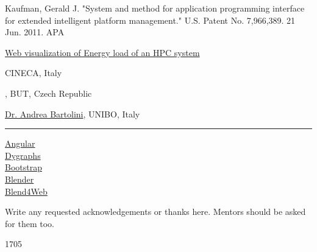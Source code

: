 \documentclass[a4paper, twoside]{article}
\begin{document}
\begin{multicols}{3}
\begin{thebibliography}{9}
Kaufman, Gerald J. "System and method for application programming interface for extended intelligent platform management." U.S. Patent No. 7,966,389. 21 Jun. 2011.
APA
\end{thebibliography}

\vfill
\noindent\begin{minipage}[b]{0.7\linewidth}
\begin{flushleft}
  \selectfont
  \href{https://summerofhpc.prace-ri.eu/web-visualization-of-energy-load-of-an-hpc-system/}{Web visualization of Energy load of an HPC system}
  
  CINECA, Italy
  
  \href{mailto:xstehl14@stud.fit.vutbr.cz}{\theauthor},
  BUT, Czech Republic
  
  \href{mailto:a.bartolini@unibo.it}{Dr. Andrea Bartolini}, UNIBO, Italy
\end{flushleft}
\end{minipage}\hfill%
\begin{minipage}[b]{0.3\linewidth}
  \color{prace-darkblue}\rule{\linewidth}{2.5cm}\par
  \tiny\theauthor
\end{minipage}%
\vspace{-1.5ex}%
\begin{flushleft}
  \href{https://www.angular.io}{Angular} \\
  \href{http://dygraphs.com}{Dygraphs}  \\
  \href{http://getbootstrap.com}{Bootstrap} \\
  \href{https://www.blender.org}{Blender} \\
  \href{https://www.blend4web.com/en/}{Blend4Web}

Write any requested acknowledgements or thanks here. Mentors should be
asked for them too.

 1705

\end{flushleft}
\end{multicols}
\end{document}
